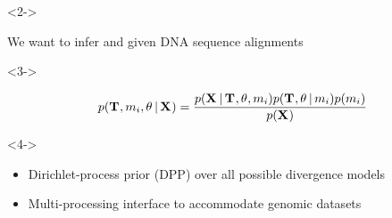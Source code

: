 \begin{frame}[t]
    \vspace{3.5mm}

    \begin{minipage}[c][0.35\textheight][c]{\linewidth}
        \begin{uncoverenv}<2->
            \begin{center}
            We want to infer \textcolor{blue}{\divModel{}} and
            \textcolor{blue}{\divTimeMapVector} given DNA sequence
            alignments
            \textcolor{blue}{\alignmentVector}
        \end{center}
        \end{uncoverenv}


        \begin{uncoverenv}<3->
            \begin{displaybox}[0.85\linewidth]
                \begin{minipage}[c][0.12\textheight][c]{\linewidth}

                \[
                    p(\divTimeMapVector,
                      \divModel{i},
                      \allParameters{}
                      \given \alignmentVector)
                      =
                    \frac{
                        p(\alignmentVector \given
                          \divTimeMapVector,
                          \allParameters{},
                          \divModel{i})
                        p(\divTimeMapVector,
                          \allParameters{}
                          \given \divModel{i})
                        p(\divModel{i})
                        }{p(\alignmentVector)}
                \]
                \vspace{-1mm}
                \end{minipage}
            \end{displaybox}
        \end{uncoverenv}

        \vspace{-1mm}

        \begin{uncoverenv}<4->
            \begin{center}
                \begin{itemize}
                    \small
                    \item Dirichlet-process prior (DPP) over all possible divergence
                        models
                    \item Multi-processing interface to accommodate genomic datasets
                \end{itemize}
            \end{center}
        \end{uncoverenv}
    \end{minipage}
\end{frame}

